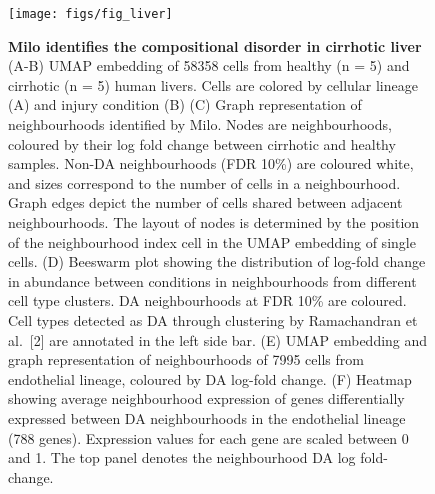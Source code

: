 \documentclass[
  10pt,
]{article}
\begin{document}
\begin{figure}[ht]
\texttt{[image: figs/fig\_liver]} \caption{\textbf{Milo identifies the compositional disorder in cirrhotic liver}
(A-B) UMAP embedding of 58358 cells from healthy (n = 5) and cirrhotic (n = 5) human livers. Cells are colored by cellular lineage (A) and injury condition (B)
(C) Graph representation of neighbourhoods identified by Milo. Nodes are neighbourhoods, coloured by their log fold change between cirrhotic and healthy samples. Non-DA neighbourhoods (FDR 10\%) are coloured white, and sizes correspond to the number of cells in a neighbourhood. Graph edges depict the number of cells shared between adjacent neighbourhoods. The layout of nodes is determined by the position of the neighbourhood index cell in the UMAP embedding of single cells. (D) Beeswarm plot showing the distribution of log-fold change in abundance between conditions in neighbourhoods from different cell type clusters. DA neighbourhoods at FDR 10\% are coloured. Cell types detected as DA through clustering by Ramachandran et al.~{[}2{]} are annotated in the left side bar. (E) UMAP embedding and graph representation of neighbourhoods of 7995 cells from endothelial lineage, coloured by DA log-fold change.
(F) Heatmap showing average neighbourhood expression of genes differentially expressed between DA neighbourhoods in the endothelial lineage (788 genes). Expression values for each gene are scaled between 0 and 1. The top panel denotes the neighbourhood DA log fold-change.}\label{fig:fig-5}
\end{figure}
\end{document}
